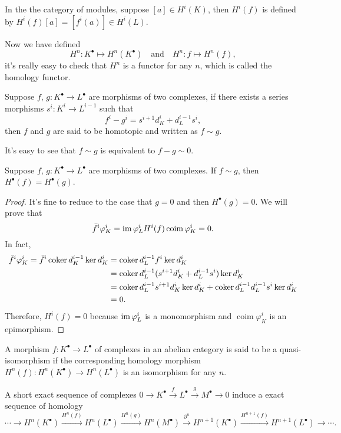 In the the category of modules, suppose $[a]\in H^i(K)$, then $H^i(f)$ is
defined by $H^i(f)[a]=[f^i(a)]\in H^i(L)$.

Now we have defined 
\[
	H^n :K^\bullet\mapsto H^n(K^\bullet)\quad \text{and}\quad
	H^n :f\mapsto H^n(f),
\]
it's really easy to check that $H^n$ is a functor for any $n$, 
which is called the homology functor.

\begin{definition}
	Suppose $f$, $g:K^\bullet\to L^\bullet$ are morphisms of two complexes,
	if there exists a series morphisms $s^i:K^i\to L^{i-1}$ such that
	\[
		f^i-g^i=s^{i+1}d_K^i+d_L^{i-1}s^i,
	\]
	then $f$ and $g$ are said to be homotopic and written as $f\sim g$.
\end{definition}

It's easy to see that $f\sim g$ is equivalent to $f-g\sim 0$.

\begin{lem}
	Suppose $f$, $g:K^\bullet\to L^\bullet$ are morphisms of two complexes.
	If $f\sim g$, then $H^\bullet(f)=H^\bullet(g)$.
\end{lem}

\begin{proof}
	It's fine to reduce to the case that $g=0$ and then $H^\bullet(g)=0$. We will
	prove that
	\[
		\bar f^i \varphi_K^i = \operatorname{im} \varphi_L^i H^i(f) \operatorname{coim} \varphi_K^i=0.
	\]
	In fact,
	\[
		\begin{aligned}
		\bar f^i \varphi_K^i=\bar f^i \operatorname{coker} d_K^{i-1}\ker d_{K}^i 
		&=\operatorname{coker} d_L^{i-1} f^i\ker d_{K}^i\\
		&=\operatorname{coker} d_L^{i-1}(s^{i+1}d_K^i+d_L^{i-1}s^i)\ker d_{K}^i\\
		&=\operatorname{coker} d_L^{i-1}s^{i+1}d_K^i\ker d_{K}^i+\operatorname{coker} d_L^{i-1}d_L^{i-1}s^i\ker d_{K}^i\\
		&=0.
		\end{aligned}
	\]
	Therefore, $H^i(f) = 0$ because $\operatorname{im} \varphi_L^i$ is a monomorphism
	and $\operatorname{coim} \varphi_K^i$ is an epimorphism.
\end{proof}

\begin{definition}
	A morphism $f:K^\bullet\to L^\bullet$ of complexes in an abelian
	category is said to be a quasi-isomorphism if the corresponding 
	homology morphism $H^n(f):H^n(K^\bullet)\to H^n(L^\bullet)$
	is an isomorphism for any $n$.
\end{definition}

\begin{pro}
	A short exact sequence of complexes $0\to K^\bullet\xrightarrow{f}L^\bullet\xrightarrow{g}M^\bullet\to 0$ induce a exact sequence 
	of homology
	\[
		\cdots\to H^n(K^\bullet)\xrightarrow{H^n(f)}H^n(L^\bullet)\xrightarrow{H^n(g)}H^n(M^\bullet)\xrightarrow{\partial^n}H^{n+1}(K^\bullet)\xrightarrow{H^{n+1}(f)}H^{n+1}(L^\bullet)\to\cdots.
	\]
\end{pro}

